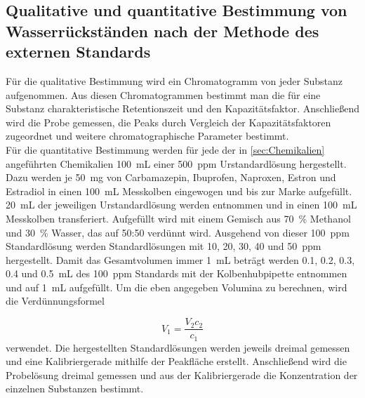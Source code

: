   \subsection{Qualitative und quantitative Bestimmung von Wasserrückständen nach der Methode des externen Standards}
    
    Für die qualitative Bestimmung wird ein Chromatogramm von jeder Substanz aufgenommen. Aus diesen Chromatogrammen bestimmt man die für eine Substanz charakteristische  Retentionszeit und den  Kapazitätsfaktor. Anschließend wird die Probe gemessen, die Peaks durch Vergleich der Kapazitätsfaktoren zugeordnet und weitere chromatographische Parameter bestimmt. \\
    
    Für die quantitative Bestimmung werden für jede der in \ref{sec:Chemikalien} angeführten Chemikalien \SI[mode=text]{100}{\milli\liter} einer \SI[mode=text]{500}{ppm} Urstandardlösung hergestellt. Dazu werden je \SI[mode=text]{50}{\milli\gram} von Carbamazepin, Ibuprofen, Naproxen, Estron und Estradiol in einen \SI[mode=text]{100}{\milli\liter} Messkolben eingewogen und bis zur Marke aufgefüllt. \SI[mode=text]{20}{\milli\liter} der jeweiligen Urstandardlösung werden entnommen und in einen \SI[mode=text]{100}{\milli\liter} Messkolben transferiert. Aufgefüllt wird mit einem Gemisch aus \SI[mode=text]{70}{\percent} Methanol und \SI[mode=text]{30}{\percent} Wasser, das auf 50:50 verdünnt wird. Ausgehend von dieser \SI[mode=text]{100}{ppm} Standardlösung werden Standardlösungen mit 10, 20, 30, 40 und \SI[mode=text]{50}{ppm} hergestellt. Damit das Gesamtvolumen immer \SI[mode=text]{1}{\milli\liter} beträgt werden 0.1, 0.2, 0.3, 0.4 und \SI[mode=text]{0.5}{\milli\liter} des \SI[mode=text]{100}{ppm} Standards mit der Kolbenhubpipette entnommen und auf \SI[mode=text]{1}{\milli\liter} aufgefüllt. Um die eben angegeben Volumina zu berechnen, wird die Verdünnungsformel
    
      \begin{equation}
        V_1 = \frac{V_2 c_2}{c_1}
      \end{equation}  
    verwendet. Die hergestellten Standardlösungen werden jeweils dreimal gemessen und eine Kalibriergerade mithilfe der Peakfläche erstellt. Anschließend wird die Probelösung dreimal gemessen und  aus der Kalibriergerade die Konzentration der einzelnen Substanzen bestimmt. 
    

